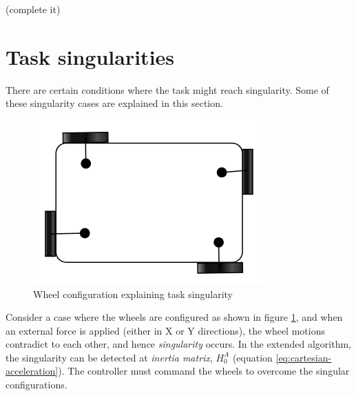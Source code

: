 (complete it)
\section{Task singularities}
There are certain conditions where the task might reach singularity. Some of these singularity cases are explained in this section. 

\begin{figure}[h!]
	\begin{center}
		\includegraphics[scale=0.4]{images/a.png}
	\end{center}
	\caption{Wheel configuration explaining task singularity}
	\label{fig:sing}
\end{figure}

Consider a case where the wheels are configured as shown in figure \ref{fig:sing}, and when an external force is applied (either in X or Y directions), the wheel motions contradict to each other, and hence \textit{singularity} occurs. In the extended algorithm, the singularity can be detected at \textit{inertia matrix}, $H_0^A$ (equation \ref{eq:cartesian-acceleration}). The controller must command the wheels to overcome the singular configurations. 





%




















